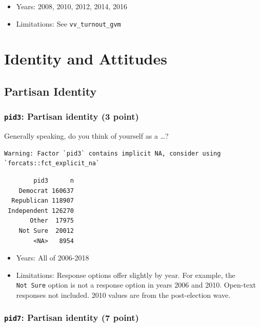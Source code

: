 \documentclass[10pt,article,oneside]{memoir}
\theoremstyle{definition}
\begin{document}
\begin{itemize}
\tightlist
\item
  Years: 2008, 2010, 2012, 2014, 2016
\item
  Limitations: See \texttt{vv\_turnout\_gvm}
\end{itemize}

\newpage

\hypertarget{identity-and-attitudes}{%
\section{Identity and Attitudes}\label{identity-and-attitudes}}

\hypertarget{partisan-identity}{%
\subsection{Partisan Identity}\label{partisan-identity}}

\hypertarget{pid3-partisan-identity-3-point}{%
\subsubsection{\texorpdfstring{\texttt{pid3}: Partisan identity (3
point)}{pid3: Partisan identity (3 point)}}\label{pid3-partisan-identity-3-point}}

Generally speaking, do you think of yourself as a \ldots{}?

\begin{verbatim}
Warning: Factor `pid3` contains implicit NA, consider using
`forcats::fct_explicit_na`
\end{verbatim}

\begin{verbatim}
        pid3      n
    Democrat 160637
  Republican 118907
 Independent 126270
       Other  17975
    Not Sure  20012
        <NA>   8954
\end{verbatim}

\begin{itemize}
\tightlist
\item
  Years: All of 2006-2018
\item
  Limitations: Response options offer slightly by year. For example, the
  \texttt{Not\ Sure} option is not a response option in years 2006 and
  2010. Open-text responses not included. 2010 values are from the
  post-election wave.
\end{itemize}

\hypertarget{pid7-partisan-identity-7-point}{%
\subsubsection{\texorpdfstring{\texttt{pid7}: Partisan identity (7
point)}{pid7: Partisan identity (7 point)}}\label{pid7-partisan-identity-7-point}}
\end{document}
